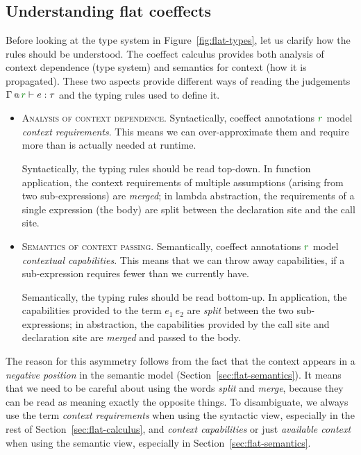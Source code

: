 
\subsection{Understanding flat coeffects}
\label{sec:flat-calculus-undestanding}

Before looking at the type system in Figure~\ref{fig:flat-types}, let us clarify how the rules
should be understood. The coeffect calculus provides both analysis of context dependence (type 
system) and semantics for context (how it is propagated). These two aspects provide different
ways of reading the judgements $\coctx{\Gamma}{\cclrd{r}} \vdash e : \tau$ and the typing rules
used to define it.

\begin{itemize}
\item \textsc{Analysis of context dependence.}
Syntactically, coeffect annotations $\cclrd{r}$ model \emph{context requirements}. This means
we can over-approximate them and require more than is actually needed at runtime. 

Syntactically, the typing rules should be read top-down. In function application, the context 
requirements of multiple assumptions (arising from two sub-expressions) are \emph{merged}; in 
lambda abstraction, the requirements of a single expression (the body) are split between
the declaration site and the call site.

\item \textsc{Semantics of context passing.}
Semantically, coeffect annotations $\cclrd{r}$ mo\-del \emph{contextual capabilities}. This means
that we can throw away capabilities, if a sub-expression requires fewer than we 
currently have.

Semantically, the typing rules should be read bottom-up. In application, the capabilities 
provided to the term $e_1~e_2$ are \emph{split} between the two sub-expressions; in abstraction,
the capabilities provided by the call site and declaration site are \emph{merged} and passed
to the body.
\end{itemize}

The reason for this asymmetry follows from the fact that the context appears in a \emph{negative
position} in the semantic model (Section~\ref{sec:flat-semantics}). It means that we need to be
careful about using the words \emph{split} and \emph{merge}, because they can be read as meaning
exactly the opposite things. To disambiguate, we always use the term \emph{context requirements} 
when using the syntactic view, especially in the rest of Section~\ref{sec:flat-calculus}, and 
\emph{context capabilities} or just \emph{available context} when using the semantic view, 
especially in Section~\ref{sec:flat-semantics}.

